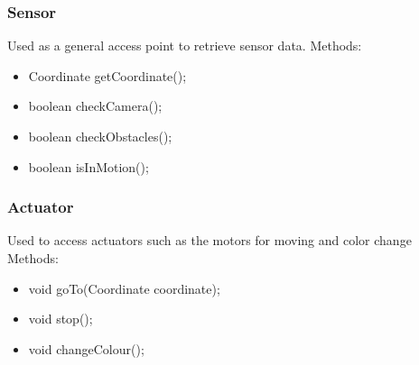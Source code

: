 \subsubsection{Sensor}
Used as a general access point to retrieve sensor data.
Methods:
\begin{itemize}
    \item Coordinate getCoordinate();
	\item boolean checkCamera();
	\item boolean checkObstacles();
    \item boolean isInMotion();
\end{itemize}

\subsubsection{Actuator}
Used to access actuators such as the motors for moving and color change
Methods:
\begin{itemize}
    \item void goTo(Coordinate coordinate);
	\item void stop();
	\item void changeColour();
\end{itemize}
